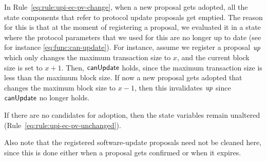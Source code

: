 In Rule~\ref{eq:rule:upi-ec-pv-change}, when a new proposal gets adopted, all
the state components that refer to protocol update proposals get emptied. The
reason for this is that at the moment of registering a proposal, we evaluated
it in a state where the protocol parameters that we used for this are no longer
up to date (see for instance \cref{eq:func:can-update}). For instance, assume
we register a proposal $\mathit{up}$ which only changes the maximum transaction
size to $x$, and the current block size is set to $x + 1$. Then,
$\mathsf{canUpdate}$ holds, since the maximum transaction size is less than the
maximum block size. If now a new proposal gets adopted that changes the maximum
block size to $x - 1$, then this invalidates $\mathit{up}$ since $\mathsf{canUpdate}$
no longer holds.
%

If there are no candidates for adoption, then the state variables remain
unaltered (Rule~\ref{eq:rule:upi-ec-pv-unchanged}).

Also note that the registered software-update proposals need not be cleaned
here, since this is done either when a proposal gets confirmed or when it
expires.

